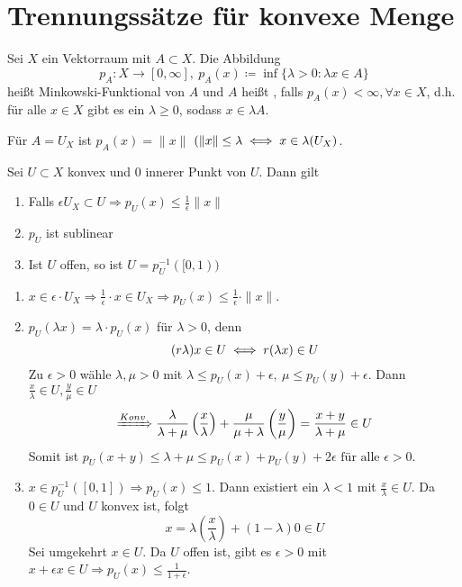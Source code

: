 

\section{Trennungssätze für konvexe Menge}


\begin{definition}
	Sei $X$ ein Vektorraum mit $A \subset X$. Die Abbildung 
		\[ p_{A} \colon X \rightarrow [0, \infty], ~ p_{A}(x) \coloneqq \inf \{ \lambda > 0 : \lambda x \in A \} \]
		hei{\ss}t Minkowski-Funktional von $A$ und $A$ hei{\ss}t , falls $p_{A}(x) < \infty, \forall x \in X$, d.h. für alle $ x \in X$ gibt es ein $\lambda \geq 0$, sodass $x \in \lambda A$.
\end{definition}


\begin{beispiel}
	Für $A = U_{X}$ ist $p_{A}(x) = \| x \|$ $( \| x \| \leq \lambda \iff x \in \lambda (U_{X})$.	
\end{beispiel}


\begin{prop} \label{prop:21.3}
	Sei $U \subset X$ konvex und $0$ innerer Punkt von $U$. Dann gilt
	\begin{enumerate}[label=\alph*\upshape)]
		\item Falls $\epsilon U_{X} \subset U \Rightarrow p_{U}(x) \leq \frac{1}{\epsilon} \| x \|$
		\item $p_{U}$ ist sublinear
		\item Ist $U$ offen, so ist $U = p_{U}^{-1}([0 , 1))$
	\end{enumerate}	
\end{prop}

\begin{beweis}
	\begin{enumerate}[label=\alph*\upshape)]
		\item $x \in \epsilon \cdot U_{X} \Rightarrow \frac{1}{\epsilon} \cdot x \in U_{X} \Rightarrow p_{U}(x) \leq \frac{1}{\epsilon} \cdot \| x \|$.
		\item $p_{U}(\lambda x ) = \lambda \cdot p_{U}(x)$ für $\lambda > 0$, denn 
			\[ (r \lambda) x \in U \iff r(\lambda x) \in U \] 
			Zu $\epsilon > 0$ wähle $\lambda, \mu > 0$ mit  $\lambda \leq p_{U}(x) + \epsilon, ~\mu \leq p_{U}(y) + \epsilon$. Dann $\frac{x}{\lambda} \in U, \frac{y}{\mu} \in U$ 
			\[ \xRightarrow[]{Konv} \frac{\lambda}{\lambda + \mu} \left( \frac{x}{\lambda} \right) + \frac{\mu}{\mu + \lambda} \left( \frac{y}{\mu} \right) = \frac{x + y}{\lambda + \mu} \in U \]
			Somit ist $p_{U}(x + y) \leq \lambda + \mu \leq p_{U}(x) + p_{U}(y) + 2 \epsilon \text{ für alle } \epsilon > 0$.
		\item $x \in p_{U}^{-1}([0, 1]) \Rightarrow p_{U}(x) \leq 1$. Dann existiert ein $\lambda < 1$ mit $\frac{x}{\lambda} \in U$. Da $0 \in U$ und $U$ konvex ist, folgt
			\[ x = \lambda \left( \frac{x}{\lambda} \right) + (1 - \lambda) 0 \in U \]
			Sei umgekehrt $x \in U$. Da $U$ offen ist, gibt es $\epsilon > 0$ mit $x + \epsilon x \in U \Rightarrow p_{U}(x) \leq \frac{1}{1 + \epsilon}$.
	\end{enumerate}
\end{beweis}


